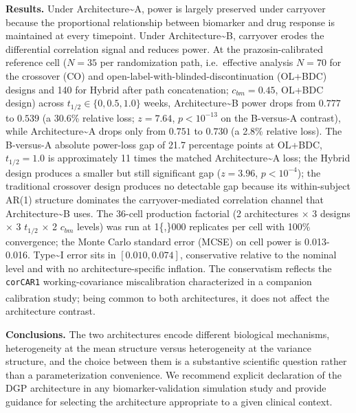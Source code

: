 \documentclass[
  11pt,
]{article}
\begin{document}
\textbf{Results.} Under Architecture\textasciitilde A, power is largely
preserved under carryover because the proportional relationship between
biomarker and drug response is maintained at every timepoint. Under
Architecture\textasciitilde B, carryover erodes the differential
correlation signal and reduces power. At the prazosin-calibrated
reference cell (\(N = 35\) per randomization path, i.e.~effective
analysis \(N = 70\) for the crossover (CO) and
open-label-with-blinded-discontinuation (OL+BDC) designs and 140 for
Hybrid after path concatenation; \(c_{bm} = 0.45\), OL+BDC design)
across \(t_{1/2} \in \{0, 0.5, 1.0\}\) weeks,
Architecture\textasciitilde B power drops from \(0.777\) to \(0.539\) (a
30.6\% relative loss; \(z = 7.64\), \(p < 10^{-13}\) on the B-versus-A
contrast), while Architecture\textasciitilde A drops only from \(0.751\)
to \(0.730\) (a 2.8\% relative loss). The B-versus-A absolute power-loss
gap of 21.7 percentage points at OL+BDC, \(t_{1/2} = 1.0\) is
approximately 11 times the matched Architecture\textasciitilde A loss;
the Hybrid design produces a smaller but still significant gap
(\(z = 3.96\), \(p < 10^{-4}\)); the traditional crossover design
produces no detectable gap because its within-subject AR(1) structure
dominates the carryover-mediated correlation channel that
Architecture\textasciitilde B uses. The 36-cell production factorial (2
architectures \(\times\) 3 designs \(\times\) 3 \(t_{1/2}\) \(\times\) 2
\(c_{bm}\) levels) was run at 1\{,\}000 replicates per cell with 100\%
convergence; the Monte Carlo standard error (MCSE) on cell power is
0.013-0.016. Type\textasciitilde I error sits in \([0.010, 0.074]\),
conservative relative to the nominal level and with no
architecture-specific inflation. The conservatism reflects the
\texttt{corCAR1} working-covariance miscalibration characterized in a
companion calibration
study\textsuperscript{}; being
common to both architectures, it does not affect the architecture
contrast.

\textbf{Conclusions.} The two architectures encode different biological
mechanisms, heterogeneity at the mean structure versus heterogeneity at
the variance structure, and the choice between them is a substantive
scientific question rather than a parameterization convenience. We
recommend explicit declaration of the DGP architecture in any
biomarker-validation simulation study and provide guidance for selecting
the architecture appropriate to a given clinical context.

\bigskip\noindent
\end{document}
